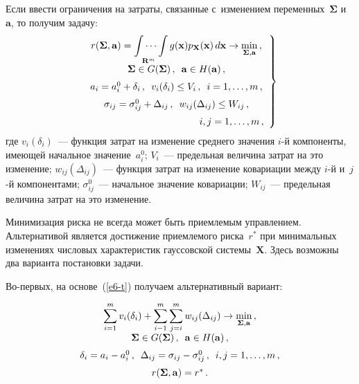 \begin{multicols}{2}
  Если ввести ограничения на за\-тра\-ты, связанные с~изменением 
переменных~$\boldsymbol{\Sigma}$ и~$\mathbf{a}$, то получим задачу:
  \begin{equation}
  \left.
  \begin{array}{c}
 \displaystyle r(\boldsymbol{\Sigma}, \mathbf{a}) =\idotsint\limits_{\mathbf{R}^m} 
g(\mathbf{x}) p_{\mathbf{X}}(\mathbf{x})\,d\mathbf{x}\to 
\min\limits_{\boldsymbol{\Sigma}, \mathbf{a}}\,,\\[6pt]
  \boldsymbol{\Sigma}\in G(\boldsymbol{\Sigma})\,,\enskip \mathbf{a}\in 
H(\mathbf{a})\,,\\[6pt]
  a_i=a_i^0+\delta_i\,,\enskip v_i(\delta_i)\leq V_i\,,\enskip i=1,\ldots ,m\,,\\[6pt]
  \sigma_{ij} =\sigma_{ij}^0 +\Delta_{ij}\,,\enskip w_{ij}(\Delta_{ij})\leq 
W_{ij}\,,\\[6pt]
\hspace*{40mm} i, j=1,\ldots ,m\,,
  \end{array}
  \right\}
  \label{e6-t}
  \end{equation}
где $v_i(\delta_i)$~--- функ\-ция за\-трат на изменение среднего значения $i$-й 
компоненты, име\-ющей начальное значение~$a_i^0$; $V_i$~--- предельная 
величина за\-трат на это изменение; $w_{ij}(\Delta_{ij})$~--- функция за\-трат на 
изменение ковариации между $i$-й и~$j$-й компонентами; $\sigma_{ij}^0$~--- 
начальное значение ковариации; $W_{ij}$~--- предельная величина за\-трат на 
это изменение.
  
  Минимизация риска не всегда может быть приемлемым управ\-ле\-ни\-ем. 
Альтернативой является достижение приемлемого рис\-ка~$r^*$ при 
минимальных изменениях чис\-ло\-вых характеристик гауссовской 
сис\-те\-мы~$\mathbf{X}$. Здесь возможны два варианта по\-ста\-нов\-ки задачи.
  
  Во-первых, на основе~(\ref{e6-t}) получаем альтернативный вариант:
  
  \noindent
  \begin{equation*}
  \begin{array}{c}
  \displaystyle \sum\limits_{i=1}^m v_i(\delta_i) +\sum\limits^m_{i-1} 
\sum\limits^m_{j=i} w_{ij}(\Delta_{ij}) \to \min\limits_{\boldsymbol{\Sigma}, 
\mathbf{a}}\,,\\[6pt]
\boldsymbol{\Sigma} \in G(\boldsymbol{\Sigma})\,,\enskip \mathbf{a}\in 
H(\mathbf{a})\,,\\[6pt]
  \delta_i =a_i-a_i^0\,,\enskip \Delta_{ij}=\sigma_{ij}-\sigma_{ij}^0\,,\enskip 
i,j=1,\ldots ,m\,,\\[6pt]
  r(\boldsymbol{\Sigma}, \mathbf{a}) =r^*\,.
  \end{array}
  \end{equation*}
  

\end{multicols}
